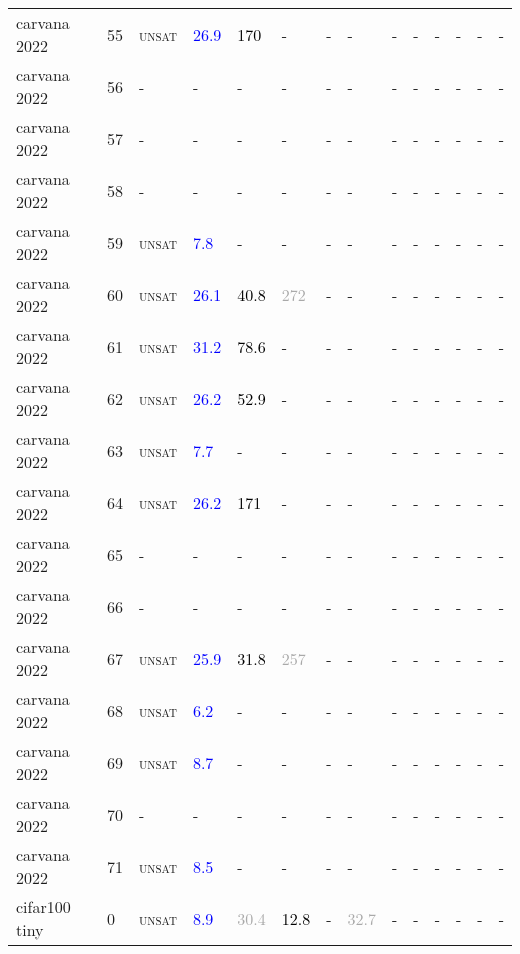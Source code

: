 \begin{center}
{\begin{longtable}{@{}llllllllllllll@{}}
carvana 2022 & 55 & \textsc{unsat} & \textcolor{blue}{26.9} & \textcolor{black}{170} & - & - & - & - & - & - & - & - & - \\
carvana 2022 & 56 & - & - & - & - & - & - & - & - & - & - & - & - \\
carvana 2022 & 57 & - & - & - & - & - & - & - & - & - & - & - & - \\
carvana 2022 & 58 & - & - & - & - & - & - & - & - & - & - & - & - \\
carvana 2022 & 59 & \textsc{unsat} & \textcolor{blue}{7.8} & - & - & - & - & - & - & - & - & - & - \\
carvana 2022 & 60 & \textsc{unsat} & \textcolor{blue}{26.1} & \textcolor{black}{40.8} & \textcolor{darkgray}{272} & - & - & - & - & - & - & - & - \\
carvana 2022 & 61 & \textsc{unsat} & \textcolor{blue}{31.2} & \textcolor{black}{78.6} & - & - & - & - & - & - & - & - & - \\
carvana 2022 & 62 & \textsc{unsat} & \textcolor{blue}{26.2} & \textcolor{black}{52.9} & - & - & - & - & - & - & - & - & - \\
carvana 2022 & 63 & \textsc{unsat} & \textcolor{blue}{7.7} & - & - & - & - & - & - & - & - & - & - \\
carvana 2022 & 64 & \textsc{unsat} & \textcolor{blue}{26.2} & \textcolor{black}{171} & - & - & - & - & - & - & - & - & - \\
carvana 2022 & 65 & - & - & - & - & - & - & - & - & - & - & - & - \\
carvana 2022 & 66 & - & - & - & - & - & - & - & - & - & - & - & - \\
carvana 2022 & 67 & \textsc{unsat} & \textcolor{blue}{25.9} & \textcolor{black}{31.8} & \textcolor{darkgray}{257} & - & - & - & - & - & - & - & - \\
carvana 2022 & 68 & \textsc{unsat} & \textcolor{blue}{6.2} & - & - & - & - & - & - & - & - & - & - \\
carvana 2022 & 69 & \textsc{unsat} & \textcolor{blue}{8.7} & - & - & - & - & - & - & - & - & - & - \\
carvana 2022 & 70 & - & - & - & - & - & - & - & - & - & - & - & - \\
carvana 2022 & 71 & \textsc{unsat} & \textcolor{blue}{8.5} & - & - & - & - & - & - & - & - & - & - \\
cifar100 tiny & 0 & \textsc{unsat} & \textcolor{blue}{8.9} & \textcolor{darkgray}{30.4} & \textcolor{black}{12.8} & - & \textcolor{darkgray}{32.7} & - & - & - & - & - & - \\

\end{longtable}}
\end{center}

